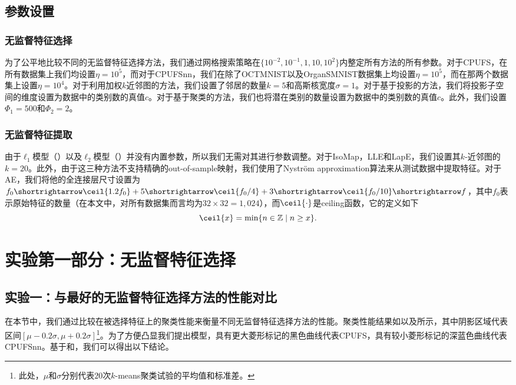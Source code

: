 \subsection{参数设置}

\subsubsection{无监督特征选择}
为了公平地比较不同的无监督特征选择方法，我们通过网格搜索策略在$\{10^{-2},10^{-1},1,10,10^{2}\}$内整定所有方法的所有参数。对于CPUFS，在所有数据集上我们均设置$\eta=10^{5}$，而对于CPUFSnn，我们在除了OCTMNIST以及OrganSMNIST数据集上均设置$\eta=10^{5}$，而在那两个数据集上设置$\eta=10^{4}$。对于利用加权$k$近邻图的方法，我们设置了邻居的数量$k=5$和高斯核宽度$\sigma=1$。对于基于投影的方法，我们将投影子空间的维度设置为数据中的类别数的真值$c$。对于基于聚类的方法，我们也将潜在类别的数量设置为数据中的类别数的真值$c$。此外，我们设置$\Phi_{1}=500$和$\Phi_{2}=2$。

\subsubsection{无监督特征提取}
由于$\ell_{1}$模型（）以及$\ell_{2}$模型（）并没有内置参数，所以我们无需对其进行参数调整。对于IsoMap，LLE和LapE，我们设置其$k$-近邻图的$k=20$。此外，由于这三种方法不支持精确的out-of-sample映射，我们使用了Nystr{\"o}m approximation算法来从测试数据中提取特征。对于AE，我们将他的全连接层尺寸设置为$f_{0}\shortrightarrow \ceil{1.2f_{0}}+5\shortrightarrow \ceil{f_{0}/4}+3\shortrightarrow \ceil{f_{0}/10}\shortrightarrow f$，其中$f_{0}$表示原始特征的数量（在本文中，对所有数据集而言均为$32\times 32=1,024$），而$\ceil{\cdot}$是ceiling函数，它的定义如下
\begin{equation*}
    \ceil{x}=\min \{n \in \mathbb{Z} \mid n \geq x\}.
\end{equation*}

\section{实验第一部分：无监督特征选择}

\subsection{实验一：与最好的无监督特征选择方法的性能对比}
在本节中，我们通过比较在被选择特征上的聚类性能来衡量不同无监督特征选择方法的性能。聚类性能结果如以及所示，其中阴影区域代表区间$[\mu-0.2\sigma,\mu+0.2\sigma]$\footnote{此处，$\mu$和$\sigma$分别代表$20$次$k$-means聚类试验的平均值和标准差。}。为了方便凸显我们提出模型，具有更大菱形标记的黑色曲线代表CPUFS，具有较小菱形标记的深蓝色曲线代表CPUFSnn。基于和，我们可以得出以下结论。

